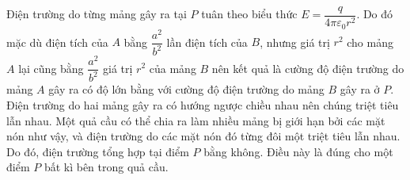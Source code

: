 \begin{loigiai}
\begin{center}

        \end{center}
        Điện trường do từng mảng gây ra tại $P$ tuân theo biểu thức $E=\dfrac{q}{4\pi\varepsilon_0 r^2}$. Do đó mặc dù điện tích của $A$ bằng $\dfrac{a^2}{b^2}$ lần điện tích của $B$, nhưng giá trị $r^2$ cho mảng $A$ lại cũng bằng $\dfrac{a^2}{b^2}$ giá trị $r^2$ của mảng $B$ nên kết quả là cường độ điện trường do mảng $A$ gây ra có độ lớn bằng với cường độ điện trường do mảng $B$ gây ra ở $P$. Điện trường do hai mảng gây ra có hướng ngược chiều nhau nên chúng triệt tiêu lẫn nhau. Một quả cầu có thể chia ra làm nhiều mảng bị giới hạn bởi các mặt nón như vậy, và điện trường do các mặt nón đó từng đôi một triệt tiêu lẫn nhau. Do đó, điện trường tổng hợp tại điểm $P$ bằng không. Điều này là đúng cho một điểm $P$ bất kì bên trong quả cầu.
    \end{loigiai}
    
